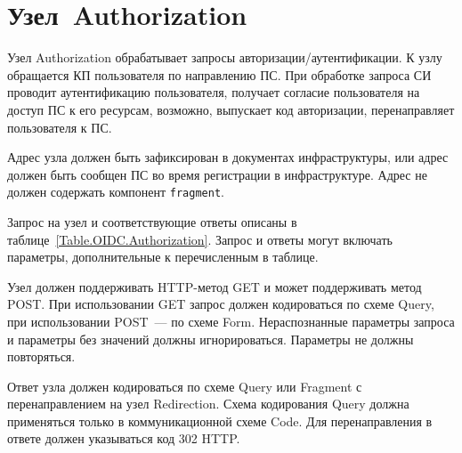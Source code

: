 \section{Узел~Authorization}\label{OIDC.Authorization}

Узел Authorization обрабатывает запросы авторизации/аутентификации. 
%
К узлу обращается КП пользователя по направлению ПС.
%
При обработке запроса СИ проводит аутентификацию пользователя, получает 
согласие пользователя на доступ ПС к его ресурсам, возможно, выпускает код 
авторизации, перенаправляет пользователя к ПС. 

Адрес узла должен быть зафиксирован в документах инфраструктуры,
или адрес должен быть сообщен ПС во время регистрации в инфраструктуре.
%
Адрес не должен содержать компонент \lstinline{fragment}.

Запрос на узел и соответствующие ответы описаны в 
таблице~\ref{Table.OIDC.Authorization}.
%
Запрос и ответы могут включать параметры, дополнительные к перечисленным в 
таблице. 

Узел должен поддерживать HTTP-метод GET и может поддерживать метод POST. 
%
При использовании GET запрос должен кодироваться по схеме Query,
при использовании POST~--- по схеме Form.
%
Нераспознанные параметры запроса и параметры без значений должны 
игнорироваться.
%
Параметры не должны повторяться.

Ответ узла должен кодироваться по схеме Query или Fragment с перенаправлением 
на узел Redirection. 
%
Схема кодирования Query должна применяться только в коммуникационной схеме Code.
%
Для перенаправления в ответе должен указываться код 302 HTTP.

